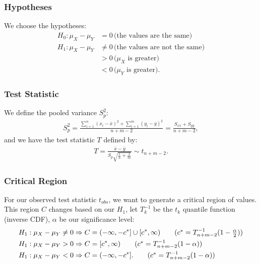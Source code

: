 \documentclass[a4paper, 12pt, twoside]{article}
\begin{document}
\subsubsection{Hypotheses}

We choose the hypotheses:
\begin{align*}
    H_0 : \mu_X - \mu_Y & = 0 \, \text{(the values are the same)}        \\
    H_1 : \mu_X - \mu_Y & \neq 0 \, \text{(the values are not the same)} \\
                        & > 0 \, \text{($\mu_X$ is greater)}             \\
                        & < 0 \, \text{($\mu_Y$ is greater)}.
\end{align*}

\subsubsection{Test Statistic}

We define the pooled variance $S_p^2$:
\begin{align*}
    S_p^2 = \frac{\sum_{i = 1}^n (x_i - \overline{x})^2
        + \sum_{i = 1}^m (y_i - \overline{y})^2}{n + m - 2}
    = \frac{S_{xx} + S_{yy}}{n + m - 2},
\end{align*}
and we have the test statistic $T$ defined by:
\begin{align*}
    T = \frac{\overline{x} - \overline{y}}
    {S_p\sqrt{\frac{1}{n} + \frac{1}{m}}} \sim t_{n + m - 2}.
\end{align*}

\subsubsection{Critical Region}

For our observed test statistic $t_{obs}$, we want to generate a
critical region of values. This region $C$ changes based on our
$H_1$, let $T^{-1}_k$ be the $t_k$ quantile function (inverse CDF),
$\alpha$ be our significance level:
\begin{align*}
    H_1 : \mu_X - \mu_Y \neq 0 & \Rightarrow
    C = (-\infty, -c^*] \cup [c^*, \infty)
    \tag{$ c^* = T^{-1}_{n + m - 2}(1 - \frac{\alpha}{2}) $}         \\
    H_1 : \mu_X - \mu_Y > 0    & \Rightarrow
    C = [c^*, \infty) \tag{$ c^* = T^{-1}_{n + m - 2}(1 - \alpha) $} \\
    H_1 : \mu_X - \mu_Y < 0    & \Rightarrow C = (-\infty, -c^*].
    \tag{$ c^* = T^{-1}_{n + m - 2}(1 - \alpha) $}
\end{align*}
\end{document}

